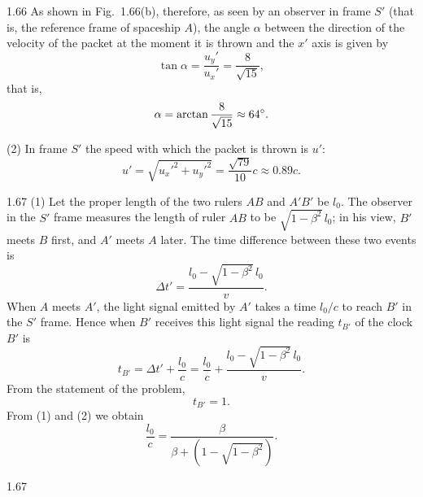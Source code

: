 \begin{solution}{1.66}
As shown in Fig.~1.66(b), therefore, as seen by an observer in frame $S'$ (that is, the reference frame of spaceship $A$), the angle $\alpha$ between the direction of the velocity of the packet at the moment it is thrown and the $x'$ axis is given by
\[
\tan\alpha=\frac{u_y'}{u_x'}=\frac{8}{\sqrt{15}},
\]
that is,
\[
\alpha=\arctan\frac{8}{\sqrt{15}}\approx64^{\circ} .
\]

(2) In frame $S'$ the speed with which the packet is thrown is $u'$:
\[
u'=\sqrt{u_x'^2+u_y'^2}=\frac{\sqrt{79}}{10}c\approx0.89c .
\]
\end{solution}

\begin{solution}{1.67}
(1) Let the proper length of the two rulers $AB$ and $A'B'$ be $l_0$. The observer in the $S'$ frame measures the length of ruler $AB$ to be $\sqrt{1-\beta^2}\,l_0$; in his view, $B'$ meets $B$ first, and $A'$ meets $A$ later. The time difference between these two events is
\[
\Delta t'=\frac{l_0-\sqrt{1-\beta^2}\,l_0}{v}.
\]
When $A$ meets $A'$, the light signal emitted by $A'$ takes a time $l_0/c$ to reach $B'$ in the $S'$ frame. Hence when $B'$ receives this light signal the reading $t_{B'}$ of the clock $B'$ is
\begin{equation}
t_{B'}=\Delta t'+\frac{l_0}{c}=\frac{l_0}{c}+\frac{l_0-\sqrt{1-\beta^2}\,l_0}{v}. \tag{1}
\end{equation}
From the statement of the problem,
\begin{equation}
t_{B'}=1. \tag{2}
\end{equation}
From (1) and (2) we obtain
\begin{equation}
\frac{l_0}{c}=\frac{\beta}{\beta+\left(1-\sqrt{1-\beta^2}\right)}. \tag{3}
\end{equation}

\begin{figbox}{1.67}
\end{figbox}


\end{solution}
